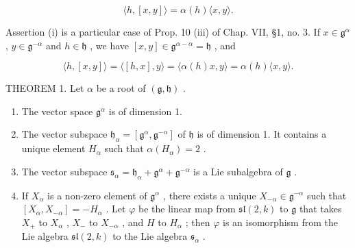 \[
\langle h, [ x, y ] \rangle = \alpha (h) \langle x, y \rangle .
\]

Assertion (i) is a particular case of Prop. 10 (iii) of Chap. VII, §1, no. 3. If \(x \in \mathfrak{g}^{\alpha}\) , \(y \in \mathfrak{g}^{-\alpha}\) and \(h \in \mathfrak{h}\) , we have \([x, y] \in \mathfrak{g}^{\alpha - \alpha} = \mathfrak{h}\) , and

\[
\langle h, [ x, y ] \rangle = \langle [ h, x ], y \rangle = \langle \alpha (h) x, y \rangle = \alpha (h) \langle x, y \rangle .
\]

THEOREM 1. Let \(\alpha\) be a root of \((\mathfrak{g},\mathfrak{h})\) .

\begin{enumerate}
\def\labelenumi{(\roman{enumi})}
\item
  The vector space \(\mathfrak{g}^{\alpha}\) is of dimension 1.
\item
  The vector subspace \(\mathfrak{h}_{\alpha} = [\mathfrak{g}^{\alpha},\mathfrak{g}^{-\alpha}]\) of \(\mathfrak{h}\) is of dimension 1. It contains a unique element \(H_{\alpha}\) such that \(\alpha (H_{\alpha}) = 2\) .
\item
  The vector subspace \(\mathfrak{s}_{\alpha} = \mathfrak{h}_{\alpha} + \mathfrak{g}^{\alpha} + \mathfrak{g}^{-\alpha}\) is a Lie subalgebra of \(\mathfrak{g}\) .
\item
  If \(X_{\alpha}\) is a non-zero element of \(\mathfrak{g}^{\alpha}\) , there exists a unique \(X_{-\alpha} \in \mathfrak{g}^{-\alpha}\) such that \([X_{\alpha}, X_{-\alpha}] = -H_{\alpha}\) . Let \(\varphi\) be the linear map from \(\mathfrak{sl}(2, k)\) to \(\mathfrak{g}\) that takes \(X_{+}\) to \(X_{\alpha}\) , \(X_{-}\) to \(X_{-\alpha}\) , and \(H\) to \(H_{\alpha}\) ; then \(\varphi\) is an isomorphism from the Lie algebra \(\mathfrak{sl}(2, k)\) to the Lie algebra \(\mathfrak{s}_{\alpha}\) .
\end{enumerate}


